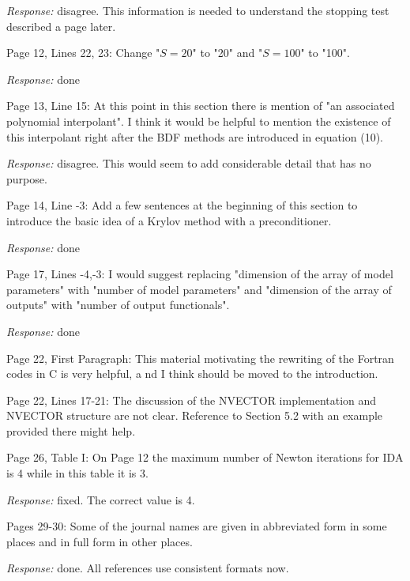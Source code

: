 {\em Response:} disagree.  This information is needed to understand the stopping
test described a page later.

Page 12, Lines 22, 23: Change "$S = 20$" to "20" and "$S = 100$" to "100".

{\em Response:} done

Page 13, Line 15: At this point in this section there is mention of "an
associated polynomial interpolant".  I think it would be helpful to
mention the existence of this interpolant right after the BDF methods
are introduced in equation (10).

{\em Response:} disagree.  This would seem to add considerable detail that has
no purpose.

Page 14, Line -3: Add a few sentences at the beginning of this section
to introduce the basic idea of a Krylov method with a preconditioner.

{\em Response:} done

Page 17, Lines -4,-3: I would suggest replacing "dimension of the array
of model parameters" with "number of model parameters" and "dimension of
the array of outputs" with "number of output functionals".

{\em Response:} done

Page 22, First Paragraph: This material motivating the rewriting of
the Fortran codes in C is very helpful, a nd I think should be moved
to the introduction.

Page 22, Lines 17-21: The discussion of the NVECTOR implementation and
NVECTOR structure are not clear.  Reference to Section 5.2 with an
example provided there might help.

Page 26, Table I: On Page 12 the maximum number of Newton iterations
for IDA is 4 while in this table it is 3.

{\em Response:} fixed.  The correct value is 4.

Pages 29-30: Some of the journal names are given in abbreviated form
in some places and in full form in other places.

{\em Response:} done.  All references use consistent formats now.



